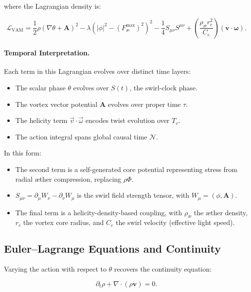 \documentclass[12pt]{article}
\begin{document}
where the Lagrangian density is:

\begin{equation}
\mathcal{L}_{\text{VAM}} = \frac{1}{2} \rho (\nabla \theta + \mathbf{A})^2 - \lambda (|\phi|^2 - (F^{\text{max}}_{\text{\ae}})^2)^2 - \frac{1}{4} S_{\mu\nu} S^{\mu\nu} + \left( \frac{\rho_{\text{\ae}} r_c^2}{C_e} \right) (\mathbf{v} \cdot \boldsymbol{\omega}).
\end{equation}

\paragraph{Temporal Interpretation.}
Each term in this Lagrangian evolves over distinct time layers:
\begin{itemize}
  \item The scalar phase $\theta$ evolves over $S(t)$, the swirl-clock phase.
  \item The vortex vector potential $\mathbf{A}$ evolves over proper time $\tau$.
  \item The helicity term $\vec{v} \cdot \vec{\omega}$ encodes twist evolution over $T_v$.
  \item The action integral spans global causal time $\mathcal{N}$.
\end{itemize}

In this form:
\begin{itemize}
    \item The second term is a self-generated core potential representing stress from radial \ae{}ther compression, replacing $\rho \Phi$.
    \item $S_{\mu\nu} = \partial_\mu W_\nu - \partial_\nu W_\mu$ is the swirl field strength tensor, with $W_\mu = (\phi, \mathbf{A})$.
    \item The final term is a helicity-density-based coupling, with $\rho_{\text{\ae}}$ the \ae{}ther density, $r_c$ the vortex core radius, and $C_e$ the swirl velocity (effective light speed).
\end{itemize}

\subsection{Euler--Lagrange Equations and Continuity}

Varying the action with respect to $\theta$ recovers the continuity equation:

\begin{equation}
\partial_t \rho + \nabla \cdot (\rho \mathbf{v}) = 0.
\end{equation}
\end{document}
